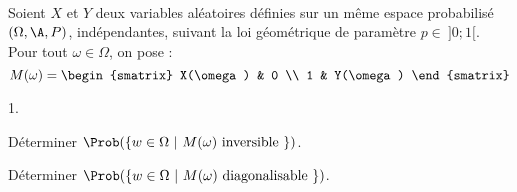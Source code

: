 \documentclass[11pt]{article}%
\begin{document}
\begin{exerciceSP}~\\
  Soient $X$ et $Y$ deux variables aléatoires définies sur un même
  espace probabilisé $(\Omega , \A , P)$, indépendantes, suivant la
  loi géométrique de paramètre $p \in \ ] 0 ; 1[$. \\
  Pour tout $\omega \in \Omega$, on pose :
  \[
  M(\omega) =
  \begin{smatrix} 
    X(\omega) & 0 \\ 
    1 & Y(\omega) 
  \end{smatrix}
  \] 
  \begin{noliste}{1.}
    \setlength{\itemsep}{2mm}
  \item Déterminer $\Prob( \{ w \in \Omega \ | \ M(\omega) \text{
      inversible } \} )$.
  \item Déterminer $\Prob( \{ w \in \Omega \ | \ M(\omega) \text{
      diagonalisable } \} )$.
  \end{noliste}
\end{exerciceSP}


\end{document}
